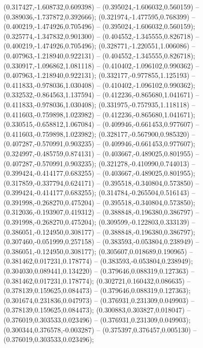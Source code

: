  (0.317427,-1.608732,0.609398) -- (0.395024,-1.606032,0.560159) -- (0.389036,-1.737872,0.392666);
 (0.321974,-1.477595,0.768399) -- (0.400219,-1.474926,0.705496) -- (0.395024,-1.606032,0.560159);
 (0.325774,-1.347832,0.901300) -- (0.404552,-1.345555,0.826718) -- (0.400219,-1.474926,0.705496);
 (0.328771,-1.220551,1.006086) -- (0.407963,-1.218940,0.922131) -- (0.404552,-1.345555,0.826718);
 (0.330917,-1.096862,1.081118) -- (0.410402,-1.096102,0.990362) -- (0.407963,-1.218940,0.922131);
 (0.332177,-0.977855,1.125193) -- (0.411833,-0.978036,1.030408) -- (0.410402,-1.096102,0.990362);
 (0.332532,-0.864563,1.137594) -- (0.412236,-0.865680,1.041671) -- (0.411833,-0.978036,1.030408);
 (0.331975,-0.757935,1.118118) -- (0.411603,-0.759898,1.023982) -- (0.412236,-0.865680,1.041671);
 (0.330515,-0.658812,1.067084) -- (0.409946,-0.661453,0.977607) -- (0.411603,-0.759898,1.023982);
 (0.328177,-0.567900,0.985320) -- (0.407287,-0.570991,0.903235) -- (0.409946,-0.661453,0.977607);
 (0.324997,-0.485759,0.874131) -- (0.403667,-0.489025,0.801955) -- (0.407287,-0.570991,0.903235);
 (0.321278,-0.410990,0.744013) -- (0.399424,-0.414177,0.683255) -- (0.403667,-0.489025,0.801955);
 (0.317859,-0.337794,0.624171) -- (0.395518,-0.340804,0.573850) -- (0.399424,-0.414177,0.683255);
 (0.314784,-0.265504,0.516143) -- (0.391998,-0.268270,0.475204) -- (0.395518,-0.340804,0.573850);
 (0.312036,-0.193907,0.419312) -- (0.388848,-0.196380,0.386797) -- (0.391998,-0.268270,0.475204);
 (0.309599,-0.122803,0.333139) -- (0.386051,-0.124950,0.308177) -- (0.388848,-0.196380,0.386797);
 (0.307460,-0.051999,0.257158) -- (0.383593,-0.053804,0.238949) -- (0.386051,-0.124950,0.308177);
 (0.305607,0.018689,0.190965) -- (0.381462,0.017231,0.178774) -- (0.383593,-0.053804,0.238949);
 (0.304030,0.089441,0.134220) -- (0.379646,0.088319,0.127363) -- (0.381462,0.017231,0.178774);
 (0.302721,0.160432,0.086635) -- (0.378139,0.159625,0.084473) -- (0.379646,0.088319,0.127363);
 (0.301674,0.231836,0.047973) -- (0.376931,0.231309,0.049903) -- (0.378139,0.159625,0.084473);
 (0.300883,0.303827,0.018047) -- (0.376019,0.303533,0.023496) -- (0.376931,0.231309,0.049903);
 (0.300344,0.376578,-0.003287) -- (0.375397,0.376457,0.005130) -- (0.376019,0.303533,0.023496);
